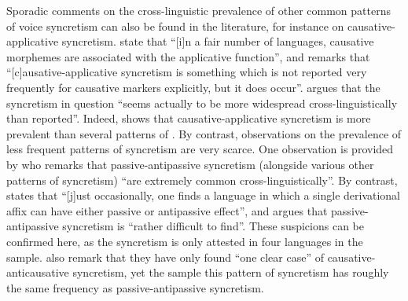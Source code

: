 Sporadic comments on the cross-linguistic prevalence of other common patterns of voice syncretism can also be found in the literature, for instance on causative-applicative syncretism. \citet[116]{shibatani:pardeshi:2002} state that “[i]n a fair number of languages, causative morphemes are associated with the applicative function”, and \citet[182]{peterson:2007} remarks that “[c]ausative-applicative syncretism is something which is not reported very frequently for causative markers explicitly, but it does occur”. \citet[10]{malchukov:2017} argues that the syncretism in question “seems actually to be more widespread cross-linguistically than reported”. Indeed,  shows that causative-applicative syncretism is more prevalent than several patterns of . By contrast, observations on the prevalence of less frequent patterns of syncretism are very scarce. One observation is provided by \citet[10]{creissels:2012} who remarks that passive-antipassive syncretism (alongside various other patterns of syncretism) “are extremely common cross-linguistically”. By contrast, \citet[151]{dixon:1994} states that “[j]ust occasionally, one finds a language in which a single derivational affix can have either passive or antipassive effect”, and \citet[241]{zuniga:kittila:2019} argues that passive-antipassive syncretism is “rather difficult to find”. These suspicions can be confirmed here, as the syncretism is only attested in four languages in the sample. \citet[244]{zuniga:kittila:2019} also remark that they have only found “one clear case” of causative-anticausative syncretism, yet the sample this pattern of syncretism has roughly the same frequency as passive-antipassive syncretism. 

